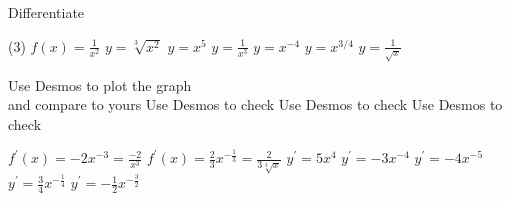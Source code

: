 \begin{Exercise}[title={Differentiation from First Principles}, label=exFirstPrinciples]
	\Question Differentiate
\begin{tasks}(3)
	\task  $f (x) =\frac{1}{x^{2}}$ %
	\task $y =\sqrt[{3}]{x^{2}}$ %
	\task $y =x^{5}$ %
	\task $y =\frac{1}{x^{3}}$ %
	\task $y =x^{ -4}$ %
	\task $y =x^{3/4}$ %
	\task $y =\frac{1}{\sqrt{x}}$ %
\end{tasks}
\end{Exercise}
\begin{Answer}[ref={exFirstPrinciples}]
\Question %
\begin{tasks}
\end{tasks}

\Question Use Desmos to plot the graph \\and compare to yours
\Question Use Desmos to check
\Question Use Desmos to check
\Question Use Desmos to check

\Question %
\begin{tasks}
	\task $f^{ \prime } (x) = -2 x^{ -3} =\frac{ -2}{x^{3}}$
	\task $f^{ \prime } \left (x\right ) =\frac{2}{3} x^{ -\frac{1}{3}} =\frac{2}{3 \sqrt[{3}]{x}}$ 
	\task $y^{ \prime } =5 x^{4}$
	\task $y^{ \prime } = -3 x^{ -4}$
	\task $y^{ \prime } = -4 x^{ -5}$
	\task $y^{ \prime } =\frac{3}{4} x^{ -\frac{1}{4}}$
	\task $y^{ \prime } = -\frac{1}{2} x^{ -\frac{3}{2}}$
	
\end{tasks}
\end{Answer}%
